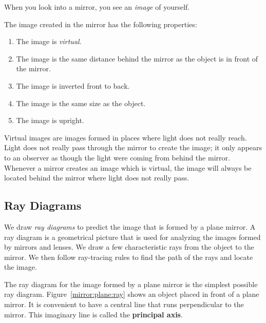 When you look into a mirror, you see an \textit{image} of yourself.

The image created in the mirror has the following properties:
\begin{enumerate}
\item{The image is \textit{virtual}.}
\item{The image is the same distance behind the mirror as the object is in front of the mirror.}
\item{The image is inverted front to back.}
\item{The image is the same size as the object.}
\item{The image is upright.}
\end{enumerate}

Virtual images are images formed in places where light does not really reach. Light does not really pass through the mirror to create the image; it only appears to an observer as though the light were coming from behind the mirror. Whenever a mirror creates an image which is virtual, the image will always be located behind the mirror where light does not really pass.


\subsection{Ray Diagrams}

We draw \textit{ray diagrams} to predict the image that is formed by a plane mirror. A ray diagram is a geometrical picture that is used for analyzing the images formed by mirrors and lenses. We draw a few characteristic rays from the object to the mirror. We then follow ray-tracing rules to find the path of the rays and locate the image.


The ray diagram for the image formed by a plane mirror is the simplest possible ray diagram. Figure~\ref{mirror:plane:ray} shows an object placed in front of a plane mirror. It is convenient to have a central line that runs perpendicular to the mirror. This imaginary line is called the \textbf{principal axis}.


